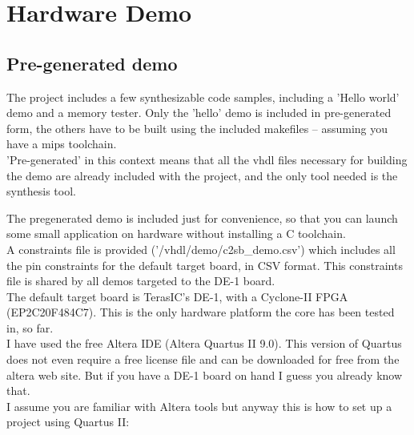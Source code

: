 \chapter{Hardware Demo}
\label{hw_demo}

\section{Pre-generated demo}
\label{pregenerated_demo}

    The project includes a few synthesizable code samples, including a 
    'Hello world' demo and a memory tester. Only the 'hello' demo is included 
    in pre-generated form, the others have to be built using the included 
    makefiles -- assuming you have a mips toolchain.\\

    'Pre-generated' in this context means that all the vhdl files necessary for 
    building the demo are already included with the project, and the only 
    tool needed is the synthesis tool.
    
    The pregenerated demo is included just for convenience, so that you can 
    launch some small application on hardware without installing a C toolchain.\\
    
    A constraints file is provided ('/vhdl/demo/c2sb\_demo.csv') which includes
    all the pin constraints for the default target board, in CSV format. This
    constraints file is shared by all demos targeted to the DE-1 board.\\

    The default target board is TerasIC's DE-1, with a Cyclone-II FPGA 
    (EP2C20F484C7). This is the only hardware platform the core has been 
    tested in, so far.\\

    I have used the free Altera IDE (Altera Quartus II 9.0). This version of
    Quartus does not even require a free license file and can be downloaded for
    free from the altera web site. But if you have a DE-1 board on hand I guess
    you already know that.\\

    I assume you are familiar with Altera tools but anyway this is how to set up
    a project using Quartus II:

